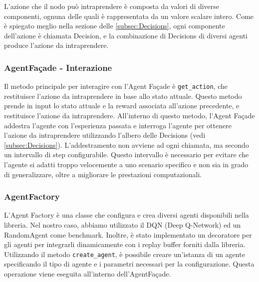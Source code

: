 \documentclass[conference]{IEEEtran}
\newcommand{\code}[1]{\texttt{#1}}
\begin{document}
L'azione che il nodo può intraprendere è composta da valori di diverse componenti,
ognuna delle quali è rappresentata da un valore scalare intero. Come è spiegato meglio
nella sezione delle \autoref{subsec:Decisions}, ogni componente dell'azione è chiamata Decision, e 
la combinazione di Decisions di diversi agenti produce l'azione da intraprendere.
\subsubsection{AgentFaçade - Interazione}
Il metodo principale per interagire con l'Agent Façade è \code{get\_action}, che restituisce l'azione da intraprendere in base allo stato attuale. Questo metodo prende in input lo stato attuale e la reward associata all'azione precedente, e restituisce l'azione da intraprendere. All'interno di questo metodo, l'Agent Façade addestra l'agente con l'esperienza passata e interroga l'agente per ottenere l'azione da intraprendere utilizzando l'albero delle Decisions  (vedi \autoref{subsec:Decisions}). L'addestramento non avviene ad ogni chiamata, ma secondo un intervallo di step configurabile. Questo intervallo è necessario per evitare che l'agente si adatti troppo velocemente a uno scenario specifico e non sia in grado di generalizzare, oltre a migliorare le prestazioni computazionali.

\subsubsection{AgentFactory}
L'Agent Factory è una classe che configura e crea diversi agenti disponibili nella libreria. Nel nostro caso, abbiamo utilizzato il DQN (Deep Q-Network) ed un RandomAgent come benchmark. Inoltre, è stato implementato un decoratore per gli agenti per integrarli dinamicamente con i replay buffer forniti dalla libreria. Utilizzando il metodo \code{create\_agent}, è possibile creare un'istanza di un agente specificando il tipo di agente e i parametri necessari per la configurazione. Questa operazione viene eseguita all'interno dell'AgentFaçade.
\end{document}
